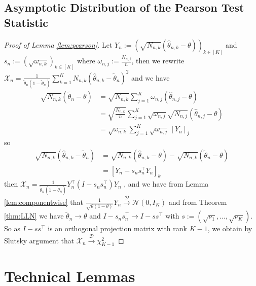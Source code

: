 \documentclass[11pt]{article}
\theoremstyle{plain}
\theoremstyle{definition}
\begin{document}
\begin{appendix}
\subsection{Asymptotic Distribution of the Pearson Test Statistic}
\begin{proof}[Proof of Lemma \ref{lem:pearson}]
	Let \(Y_n := \left( \sqrt{N_{n,k}}(\hat{\theta}_{n,k} - \theta)\right)_{k \in [K]}\) and \(s_n:=\left(\sqrt{\omega_{n,k}}\right)_{k \in [K]}\) where \(\omega_{n,j}:=\frac{N_{n,j}}{n}\), then we rewrite \(\mathcal{X}_n = \frac{1}{\tilde{\theta}_n (1 - \tilde{\theta}_n)} 
	\sum_{k=1}^K N_{n,k} (\hat{\theta}_{n,k} - \tilde{\theta}_n)^2\)
	and we have
	\begin{align*}
		\sqrt{N_{n,k}} (\tilde{\theta}_n - \theta)
		&= \sqrt{N_{n,k}} \sum_{j=1}^K \omega_{n,j} (\hat{\theta}_{n,j} - \theta)\\
		&= \sqrt{\frac{N_{n,k}}{n}} \sum_{j=1}^K \sqrt{\omega_{n,j}}\sqrt{N_{n,j}} (\hat{\theta}_{n,j} - \theta)\\
		&= \sqrt{\omega_{n,k}} \sum_{j=1}^K \sqrt{\omega_{n,j}} \, [Y_n]_j
	\end{align*}
	so 
	\begin{align*}
		\sqrt{N_{n,k}} (\hat{\theta}_{n,k} - \tilde{\theta}_n) &= \sqrt{N_{n,k}} (\hat{\theta}_{n,k} - \theta) 
		- \sqrt{N_{n,k}} (\tilde{\theta}_n - \theta)\\
		&= [Y_n - s_n s_n^\top Y_n]_k
	\end{align*}
	then \(\mathcal{X}_n = \frac{1}{\tilde{\theta}_n (1 - \tilde{\theta}_n)} 
	Y_n^\top (I - s_n s_n^\top) Y_n\)
	, and we have from Lemma \ref{lem:componentwise} that \(\frac{1}{\sqrt{\theta(1-\theta)}} Y_n \xrightarrow{\mathcal{D}} \mathcal{N}(0, I_K)\) and from Theorem \ref{thm:LLN} we have \(\tilde{\theta}_n \to \theta\) and \(I - s_n s_n^\top \to I - s s^\top
	\) with \(s := (\sqrt{\nu_1}, \dots, \sqrt{\nu_K})\). So as $I - s s^\top$ is an orthogonal projection matrix with rank $K-1$, we obtain by Slutsky argument that \(\mathcal{X}_n \xrightarrow{\mathcal{D}} \chi^2_{K-1}\)
\end{proof}



		
		\section{Technical Lemmas}\label{appnC}

\end{appendix}
\end{document}
